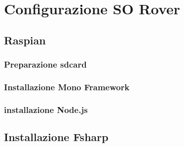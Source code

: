 \chapter{Configurazione SO Rover} 

\section{Raspian}

\subsection{Preparazione sdcard}
 
 

\subsection{Installazione Mono Framework}
 

\subsection{installazione Node.js}
 
\section{Installazione Fsharp}

